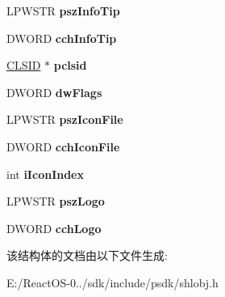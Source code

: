\begin{DoxyCompactItemize}
\mbox{\label{struct_s_h_f_o_l_d_e_r_c_u_s_t_o_m_s_e_t_t_i_n_g_s_w_adeabed1929c54f63f1c1f879ec47603e}} 
L\+P\+W\+S\+TR {\bfseries psz\+Info\+Tip}
\item 
\mbox{\label{struct_s_h_f_o_l_d_e_r_c_u_s_t_o_m_s_e_t_t_i_n_g_s_w_ac356d85cb185825effc00c5606ee7a3c}} 
D\+W\+O\+RD {\bfseries cch\+Info\+Tip}
\item 
\mbox{\label{struct_s_h_f_o_l_d_e_r_c_u_s_t_o_m_s_e_t_t_i_n_g_s_w_a0dfc3d6b462d57b43eef0e19f641c3d5}} 
\hyperlink{struct___i_i_d}{C\+L\+S\+ID} $\ast$ {\bfseries pclsid}
\item 
\mbox{\label{struct_s_h_f_o_l_d_e_r_c_u_s_t_o_m_s_e_t_t_i_n_g_s_w_ad807e90dc8c6c2b05d9cad514d88a3d4}} 
D\+W\+O\+RD {\bfseries dw\+Flags}
\item 
\mbox{\label{struct_s_h_f_o_l_d_e_r_c_u_s_t_o_m_s_e_t_t_i_n_g_s_w_a9285116ff7ffd4873bb8a422e4e462b9}} 
L\+P\+W\+S\+TR {\bfseries psz\+Icon\+File}
\item 
\mbox{\label{struct_s_h_f_o_l_d_e_r_c_u_s_t_o_m_s_e_t_t_i_n_g_s_w_a3786c29a6e02bfaa4c41c30dd97eecd0}} 
D\+W\+O\+RD {\bfseries cch\+Icon\+File}
\item 
\mbox{\label{struct_s_h_f_o_l_d_e_r_c_u_s_t_o_m_s_e_t_t_i_n_g_s_w_a8f835bbd75d713b20447b779a78661da}} 
int {\bfseries i\+Icon\+Index}
\item 
\mbox{\label{struct_s_h_f_o_l_d_e_r_c_u_s_t_o_m_s_e_t_t_i_n_g_s_w_a3281fff905378b618886da408e006105}} 
L\+P\+W\+S\+TR {\bfseries psz\+Logo}
\item 
\mbox{\label{struct_s_h_f_o_l_d_e_r_c_u_s_t_o_m_s_e_t_t_i_n_g_s_w_a0ac042674381f5b8c2d6d69113dacf4b}} 
D\+W\+O\+RD {\bfseries cch\+Logo}
\end{DoxyCompactItemize}


该结构体的文档由以下文件生成\+:\begin{DoxyCompactItemize}
\item 
E\+:/\+React\+O\+S-\/0../sdk/include/psdk/shlobj.\+h\end{DoxyCompactItemize}

